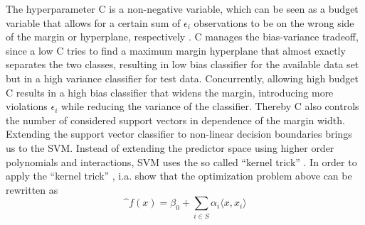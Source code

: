 The hyperparameter C is a non-negative variable, which can be seen as a budget variable that allows for a certain sum of $\epsilon_i$ observations to be on the wrong side of the margin or hyperplane, respectively \cite{James:2014:ISL:2517747}. C manages the bias-variance tradeoff, since a low C tries to find a maximum margin hyperplane that almost exactly separates the two classes, resulting in low bias classifier for the available data set but in a high variance classifier for test data. Concurrently, allowing high budget C results in a high bias classifier that widens the margin, introducing more violations $\epsilon_i$ while reducing the variance of the classifier. Thereby C also controls the number of considered support vectors in dependence of the margin width.\\

Extending the support vector classifier to non-linear decision boundaries brings us to the SVM. Instead of extending the predictor space using higher order polynomials and interactions, SVM uses the so called ``kernel trick'' \cite{efron_hastie_2016}. In order to apply the ``kernel trick'' , i.a. \citeauthor{efron_hastie_2016} show that the optimization problem above can be rewritten as
\begin{equation}
  \^{f}(x) = \beta_0 + \sum_{i \in S} \alpha_i \langle x, x_i \rangle
\end{equation}

